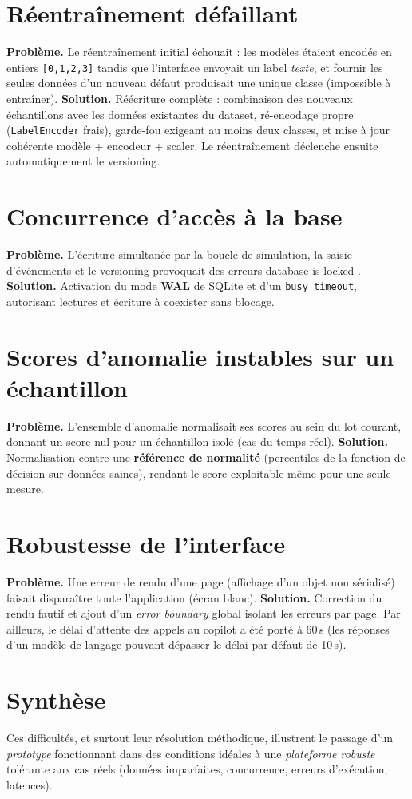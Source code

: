 \section{Réentraînement défaillant}
\textbf{Problème.} Le réentraînement initial échouait : les modèles étaient encodés en
entiers \texttt{[0,1,2,3]} tandis que l'interface envoyait un label \emph{texte}, et fournir
les seules données d'un nouveau défaut produisait une unique classe (impossible à entraîner).
\textbf{Solution.} Réécriture complète : combinaison des nouveaux échantillons avec les
données existantes du dataset, ré-encodage propre (\texttt{LabelEncoder} frais), garde-fou
exigeant au moins deux classes, et mise à jour cohérente modèle + encodeur + scaler. Le
réentraînement déclenche ensuite automatiquement le versioning.

\section{Concurrence d'accès à la base}
\textbf{Problème.} L'écriture simultanée par la boucle de simulation, la saisie d'événements
et le versioning provoquait des erreurs \og database is locked \fg.
\textbf{Solution.} Activation du mode \textbf{WAL} de SQLite et d'un \texttt{busy\_timeout},
autorisant lectures et écriture à coexister sans blocage.

\section{Scores d'anomalie instables sur un échantillon}
\textbf{Problème.} L'ensemble d'anomalie normalisait ses scores au sein du lot courant,
donnant un score nul pour un échantillon isolé (cas du temps réel).
\textbf{Solution.} Normalisation contre une \textbf{référence de normalité} (percentiles de
la fonction de décision sur données saines), rendant le score exploitable même pour une seule
mesure.

\section{Robustesse de l'interface}
\textbf{Problème.} Une erreur de rendu d'une page (affichage d'un objet non sérialisé)
faisait disparaître toute l'application (écran blanc). \textbf{Solution.} Correction du rendu
fautif et ajout d'un \emph{error boundary} global isolant les erreurs par page. Par ailleurs,
le délai d'attente des appels au copilot a été porté à 60\,s (les réponses d'un modèle de
langage pouvant dépasser le délai par défaut de 10\,s).

\section{Synthèse}
Ces difficultés, et surtout leur résolution méthodique, illustrent le passage d'un
\emph{prototype} fonctionnant dans des conditions idéales à une \emph{plateforme robuste}
tolérante aux cas réels (données imparfaites, concurrence, erreurs d'exécution, latences).
